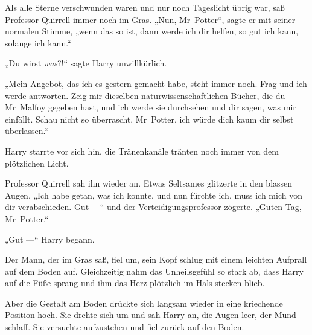 Als alle Sterne verschwunden waren und nur noch Tageslicht übrig war, saß Professor Quirrell immer noch im Gras.
„Nun, Mr~Potter“, sagte er mit seiner normalen Stimme, „wenn das so ist, dann werde ich dir helfen, so gut ich kann, solange ich kann.“

„Du wirst \emph{was}?!“ sagte Harry unwillkürlich.

„Mein Angebot, das ich es gestern gemacht habe, steht immer noch. Frag und ich werde antworten. Zeig mir dieselben naturwissenschaftlichen Bücher, die du Mr~Malfoy gegeben hast, und ich werde sie durchsehen und dir sagen, was mir einfällt. Schau nicht so überrascht, Mr~Potter, ich würde dich kaum dir selbst überlassen.“

Harry starrte vor sich hin, die Tränenkanäle tränten noch immer von dem plötzlichen Licht.

Professor Quirrell sah ihn wieder an. Etwas Seltsames glitzerte in den blassen Augen.
„Ich habe getan, was ich konnte, und nun fürchte ich, muss ich mich von dir verabschieden. Gut —“ und der Verteidigungsprofessor zögerte.
„Guten Tag, Mr~Potter.“

„Gut —“ Harry begann.

Der Mann, der im Gras saß, fiel um, sein Kopf schlug mit einem leichten Aufprall auf dem Boden auf. Gleichzeitig nahm das Unheilsgefühl so stark ab, dass Harry auf die Füße sprang und ihm das Herz plötzlich im Hals stecken blieb.

Aber die Gestalt am Boden drückte sich langsam wieder in eine kriechende Position hoch. Sie drehte sich um und sah Harry an, die Augen leer, der Mund schlaff. Sie versuchte aufzustehen und fiel zurück auf den Boden.

